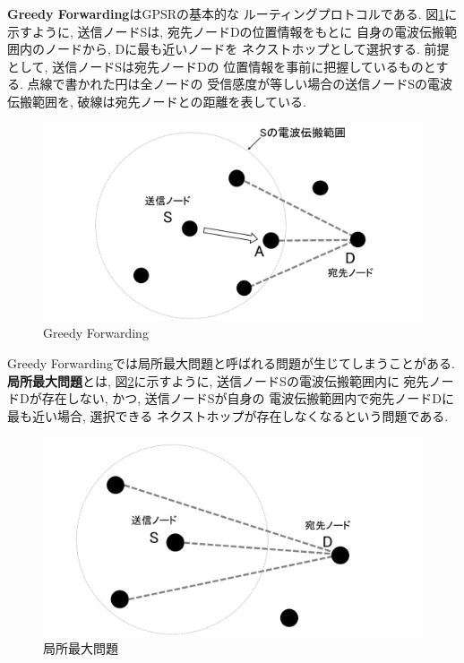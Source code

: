 \indent \textbf{Greedy Forwarding}はGPSRの基本的な
ルーティングプロトコルである. 図\ref{fig:greedy}に示すように, 
送信ノードSは, 宛先ノードDの位置情報をもとに
自身の電波伝搬範囲内のノードから, Dに最も近いノードを
ネクストホップとして選択する. 前提として, 送信ノードSは宛先ノードDの
位置情報を事前に把握しているものとする. 点線で書かれた円は全ノードの
受信感度が等しい場合の送信ノードSの電波伝搬範囲を, 
破線は宛先ノードとの距離を表している.

\begin{figure}
  \centering
  \includegraphics[scale=0.55]{figures/greedy.png}
  \caption{Greedy Forwarding\cite{shinato}}
  \label{fig:greedy}
\end{figure}

Greedy Forwardingでは局所最大問題と呼ばれる問題が生じてしまうことがある. 
\textbf{局所最大問題}とは, 図\ref{fig:local}に示すように, 送信ノードSの電波伝搬範囲内に
宛先ノードDが存在しない, かつ, 送信ノードSが自身の
電波伝搬範囲内で宛先ノードDに最も近い場合, 選択できる
ネクストホップが存在しなくなるという問題である.

\begin{figure}
  \centering
  \includegraphics[scale=0.55]{figures/local.png}
  \caption{局所最大問題}
  \label{fig:local}
\end{figure}
